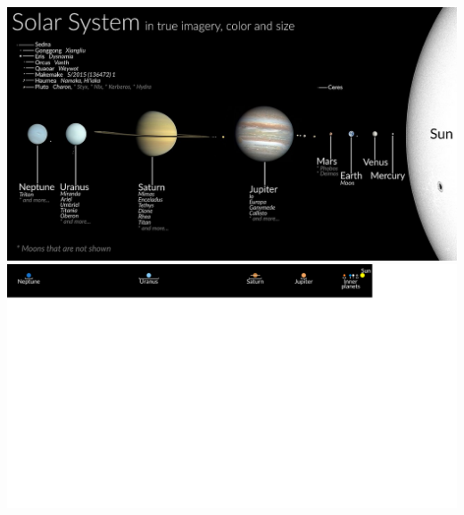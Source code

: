 \documentclass[aspectratio=169,xcolor=pdftex,dvipsnames]{beamer} %
\begin{document}
\begin{frame}
\includegraphics[scale=0.305]{planetsSize.jpg}
\\
\includegraphics[scale=0.3126]{planetsDistance.pdf}


\end{frame}
\end{document}
